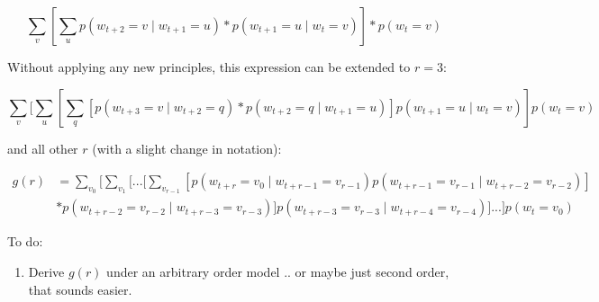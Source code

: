 \documentclass[11pt,letterpaper]{article}
\theoremstyle{definition}
\begin{document}
\[ \sum_v [\sum_u p(w_{t+2} = v \mid w_{t+1} = u ) * p(w_{t+1} = u \mid w_{t} = v)] * p(w_{t} = v) \]

Without applying any new principles, this expression can be extended to $r = 3$:


\[ \sum_v [\sum_u [\sum_q [p(w_{t+3} = v \mid w_{t+2} = q ) * p(w_{t+2} = q \mid w_{t+1} = u)] p(w_{t+1} = u \mid w_{t} = v) ] p(w_{t} = v) \]

and all other $r$ (with a slight change in notation):

\begin{align} g(r) &= \sum_{v_0}[ \sum_{v_1} [ ... [ \sum_{v_{r-1}} [ p(w_{t+r} = v_0 \mid w_{t+r-1} = v_{r-1}) p(w_{t+r-1} = v_{r-1} \mid w_{t+r-2} = v_{r-2})] \\
&* p(w_{t+r-2} = v_{r-2} \mid w_{t+r-3} = v_{r-3})] p(w_{t+r-3} = v_{r-3} \mid w_{t+r-4} = v_{r-4})] ... ] p(w_t = v_0) 
\end{align}








To do:
\begin{enumerate}
\item Derive $g(r)$ under an arbitrary order model .. or maybe just second order, that sounds easier.
\end{enumerate}


% 
% 
\end{document}
